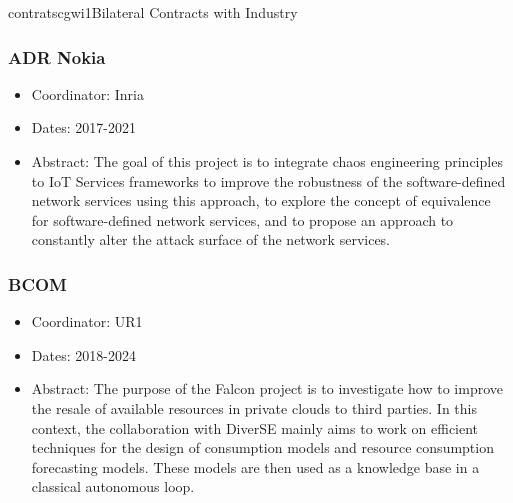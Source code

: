 \documentclass{ra2018}
\begin{document}


\begin{module}{contrats}{cgwi1}{Bilateral Contracts with Industry}

\subsubsection*{ADR Nokia}

\begin{itemize}
	\item Coordinator: Inria
	\item Dates: 2017-2021
	\item Abstract: The goal of this project is to integrate chaos engineering principles to IoT Services frameworks to improve the robustness of the software-defined network services using this approach, to explore the concept of equivalence for software-defined network services, and to propose an approach to constantly alter the attack surface of the network services.
\end{itemize}


\subsubsection*{BCOM}

\begin{itemize}
	\item Coordinator: UR1
	\item Dates: 2018-2024
	\item Abstract: The purpose of the Falcon project is to investigate how to improve the resale of available resources in private clouds to third parties. In this context, the collaboration with DiverSE mainly aims to work on efficient techniques for the design of consumption models and resource consumption forecasting models. These models are then used as a knowledge base in a classical autonomous loop.  
	
	
\end{itemize}


\end{module}
\end{document}
